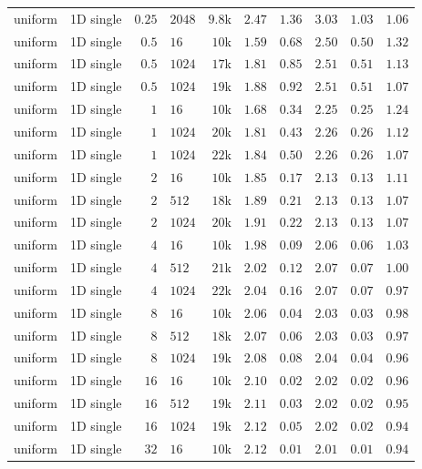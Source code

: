 {\begin{longtable}{llrlrrrrrr}
    uniform & 1D single & $0.25$ & $2048$ & $9.8$k & $2.47$ & $1.36$ & $3.03$ & $1.03$ & $1.06$ \\
    uniform & 1D single & $0.5$ & $16$ & $10$k & $1.59$ & $0.68$ & $2.50$ & $0.50$ & $1.32$ \\
    uniform & 1D single & $0.5$ & $1024$ & $17$k & $1.81$ & $0.85$ & $2.51$ & $0.51$ & $1.13$ \\
    uniform & 1D single & $0.5$ & $1024$ & $19$k & $1.88$ & $0.92$ & $2.51$ & $0.51$ & $1.07$ \\
    uniform & 1D single & $1$ & $16$ & $10$k & $1.68$ & $0.34$ & $2.25$ & $0.25$ & $1.24$ \\
    uniform & 1D single & $1$ & $1024$ & $20$k & $1.81$ & $0.43$ & $2.26$ & $0.26$ & $1.12$ \\
    uniform & 1D single & $1$ & $1024$ & $22$k & $1.84$ & $0.50$ & $2.26$ & $0.26$ & $1.07$ \\
    uniform & 1D single & $2$ & $16$ & $10$k & $1.85$ & $0.17$ & $2.13$ & $0.13$ & $1.11$ \\
    uniform & 1D single & $2$ & $512$ & $18$k & $1.89$ & $0.21$ & $2.13$ & $0.13$ & $1.07$ \\
    uniform & 1D single & $2$ & $1024$ & $20$k & $1.91$ & $0.22$ & $2.13$ & $0.13$ & $1.07$ \\
    uniform & 1D single & $4$ & $16$ & $10$k & $1.98$ & $0.09$ & $2.06$ & $0.06$ & $1.03$ \\
    uniform & 1D single & $4$ & $512$ & $21$k & $2.02$ & $0.12$ & $2.07$ & $0.07$ & $1.00$ \\
    uniform & 1D single & $4$ & $1024$ & $22$k & $2.04$ & $0.16$ & $2.07$ & $0.07$ & $0.97$ \\
    uniform & 1D single & $8$ & $16$ & $10$k & $2.06$ & $0.04$ & $2.03$ & $0.03$ & $0.98$ \\
    uniform & 1D single & $8$ & $512$ & $18$k & $2.07$ & $0.06$ & $2.03$ & $0.03$ & $0.97$ \\
    uniform & 1D single & $8$ & $1024$ & $19$k & $2.08$ & $0.08$ & $2.04$ & $0.04$ & $0.96$ \\
    uniform & 1D single & $16$ & $16$ & $10$k & $2.10$ & $0.02$ & $2.02$ & $0.02$ & $0.96$ \\
    uniform & 1D single & $16$ & $512$ & $19$k & $2.11$ & $0.03$ & $2.02$ & $0.02$ & $0.95$ \\
    uniform & 1D single & $16$ & $1024$ & $19$k & $2.12$ & $0.05$ & $2.02$ & $0.02$ & $0.94$ \\
    uniform & 1D single & $32$ & $16$ & $10$k & $2.12$ & $0.01$ & $2.01$ & $0.01$ & $0.94$ \\

\end{longtable}}
